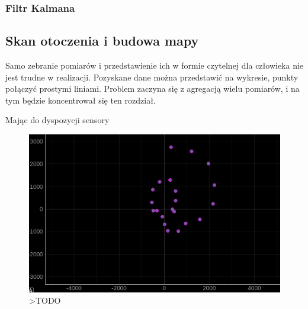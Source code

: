 \subsubsection{Filtr Kalmana}






\subsection{Skan otoczenia i budowa mapy}
\label{sec:scan}

Samo zebranie pomiarów i przedstawienie ich w formie czytelnej dla człowieka nie jest trudne w realizacji. Pozyskane dane można przedstawić na wykresie, punkty połączyć prostymi liniami. Problem zaczyna się z agregacją wielu pomiarów, i na tym będzie koncentrował się ten rozdział.

Mając do dyspozycji sensory




\begin{figure}[ht]
	\centering
		\includegraphics[width=0.8\linewidth]{rys/calibrated-mag-high-interference-broken-rotation.PNG}
	\caption{>TODO}
	\label{fig:xxx}
\end{figure}

